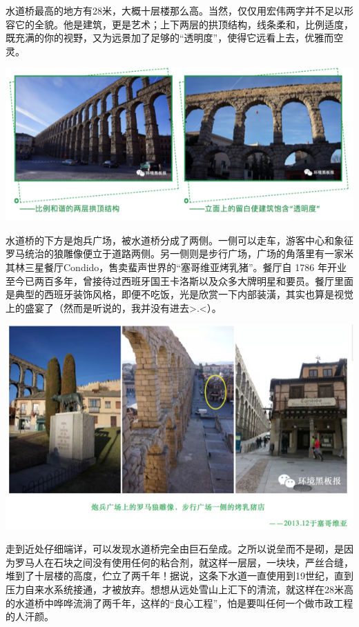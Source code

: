 \documentclass[
]{book}
\begin{document}
水道桥最高的地方有28米，大概十层楼那么高。当然，仅仅用宏伟两字并不足以形容它的全貌。他是建筑，更是艺术；上下两层的拱顶结构，线条柔和，比例适度，既充满的你的视野，又为远景加了足够的``透明度''，使得它远看上去，优雅而空灵。

\includegraphics[width=8.33in]{images/xt45}

水道桥的下方是炮兵广场，被水道桥分成了两侧。一侧可以走车，游客中心和象征罗马统治的狼雕像便立于道路两侧。另一侧则是步行广场，广场的角落里有一家米其林三星餐厅Condido，售卖蜚声世界的``塞哥维亚烤乳猪''。餐厅自 1786 年开业至今已两百多年，曾接待过西班牙国王卡洛斯以及众多大牌明星和要员。餐厅里面是典型的西班牙装饰风格，即便不吃饭，光是欣赏一下内部装潢，其实也算是视觉上的盛宴了（然而是听说的，我并没有进去\textgreater.\textless）。

\includegraphics[width=8.33in]{images/xt46}

走到近处仔细端详，可以发现水道桥完全由巨石垒成。之所以说垒而不是砌，是因为罗马人在石块之间没有使用任何的粘合剂，就这样一层层，一块块，严丝合缝，堆到了十层楼的高度，伫立了两千年！据说，这条下水道一直使用到19世纪，直到压力自来水系统接通，才被放弃。想想从远处雪山上汇下的清流，就这样在28米高的水道桥中哗哗流淌了两千年，这样的``良心工程''，怕是要叫任何一个做市政工程的人汗颜。
\end{document}
